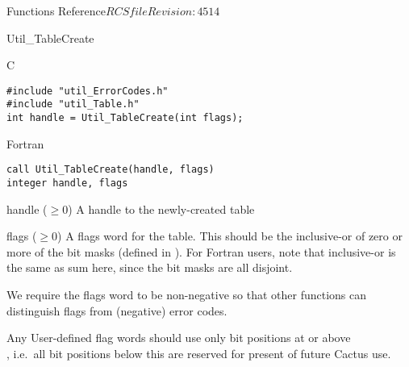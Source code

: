 \begin{cactuspart}{ Functions Reference}{$RCSfile$}{$Revision: 4514 $}
\begin{FunctionDescription}{Util\_TableCreate}
\begin{SynopsisSection}
\begin{Synopsis}{C}
\begin{verbatim}
#include "util_ErrorCodes.h"
#include "util_Table.h"
int handle = Util_TableCreate(int flags);
\end{verbatim}
\end{Synopsis}
\begin{Synopsis}{Fortran}
\begin{verbatim}
call Util_TableCreate(handle, flags)
integer handle, flags
\end{verbatim}
\end{Synopsis}
\end{SynopsisSection}

\begin{ResultSection}
\begin{Result}{handle ($\ge 0$)}
A handle to the newly-created table
\end{Result}
\end{ResultSection}

\begin{ParameterSection}
\begin{Parameter}{flags ($\ge 0$)}
A flags word for the table.  This should be the inclusive-or of zero
or more of the  bit masks (defined in
).  For Fortran users, note that inclusive-or
is the same as sum here, since the bit masks are all disjoint.
\end{Parameter}
\end{ParameterSection}

\begin{Discussion}
We require the flags word to be non-negative so that other
functions can distinguish flags from (negative) error codes.

Any User-defined flag words should use only bit positions at or above\\
, i.e.\ all bit positions
below this are reserved for present of future Cactus use.


\end{Discussion}
\end{FunctionDescription}
\end{cactuspart}
